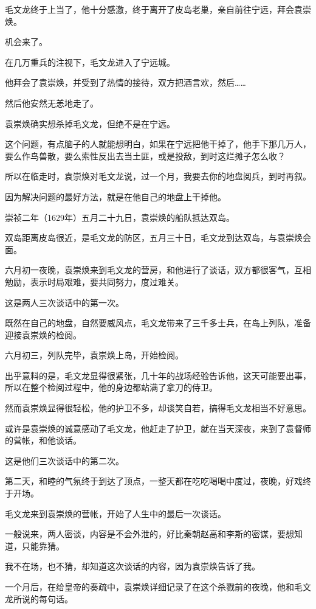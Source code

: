 \begin{multicols}{\theparacolNo}
		毛文龙终于上当了，他十分感激，终于离开了皮岛老巢，亲自前往宁远，拜会袁崇焕。

		机会来了。

		在几万重兵的注视下，毛文龙进入了宁远城。

		他拜会了袁崇焕，并受到了热情的接待，双方把酒言欢，然后……

		然后他安然无恙地走了。

		袁崇焕确实想杀掉毛文龙，但绝不是在宁远。

		这个问题，有点脑子的人就能想明白，如果在宁远把他干掉了，他手下那几万人，要么作鸟兽散，要么索性反出去当土匪，或是投敌，到时这烂摊子怎么收？

		所以在临走时，袁崇焕对毛文龙说，过一个月，我要去你的地盘阅兵，到时再叙。

		因为解决问题的最好方法，就是在他自己的地盘上干掉他。

		崇祯二年（1629年）五月二十九日，袁崇焕的船队抵达双岛。

		双岛距离皮岛很近，是毛文龙的防区，五月三十日，毛文龙到达双岛，与袁崇焕会面。

		六月初一夜晚，袁崇焕来到毛文龙的营房，和他进行了谈话，双方都很客气，互相勉励，表示时局艰难，要共同努力，度过难关。

		这是两人三次谈话中的第一次。

		既然在自己的地盘，自然要威风点，毛文龙带来了三千多士兵，在岛上列队，准备迎接袁崇焕的检阅。

		六月初三，列队完毕，袁崇焕上岛，开始检阅。

		出乎意料的是，毛文龙显得很紧张，几十年的战场经验告诉他，这天可能要出事，所以在整个检阅过程中，他的身边都站满了拿刀的侍卫。

		然而袁崇焕显得很轻松，他的护卫不多，却谈笑自若，搞得毛文龙相当不好意思。

		或许是袁崇焕的诚意感动了毛文龙，他赶走了护卫，就在当天深夜，来到了袁督师的营帐，和他谈话。

		这是他们三次谈话中的第二次。

		第二天，和睦的气氛终于到达了顶点，一整天都在吃吃喝喝中度过，夜晚，好戏终于开场。

		毛文龙来到袁崇焕的营帐，开始了人生中的最后一次谈话。

		一般说来，两人密谈，内容是不会外泄的，好比秦朝赵高和李斯的密谋，要想知道，只能靠猜。

		我不在场，也不猜，却知道这次谈话的内容，因为袁崇焕告诉了我。

		一个月后，在给皇帝的奏疏中，袁崇焕详细记录了在这个杀戮前的夜晚，他和毛文龙所说的每句话。


\end{multicols}
